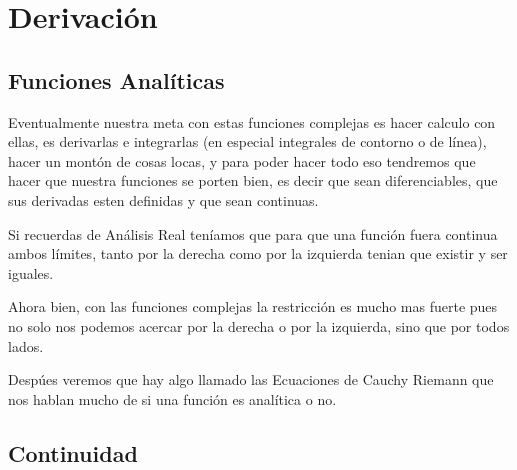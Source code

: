 \documentclass[12pt, fleqn]{report}                             %
\begin{document}
               


    \chapter{Derivación}
        \clearpage


   



        \section{Funciones Analíticas}

            Eventualmente nuestra meta con estas funciones complejas es hacer 
            calculo con ellas, es derivarlas e integrarlas (en especial integrales
            de contorno o de línea), hacer un montón de cosas locas, y para poder
            hacer todo eso tendremos que hacer que nuestra funciones se porten bien,
            es decir que sean diferenciables, que sus derivadas esten definidas y
            que sean continuas.

            Si recuerdas de Análisis Real teníamos que para que una función fuera 
            continua ambos límites, tanto por la derecha como por la izquierda 
            tenian que existir y ser iguales.

            Ahora bien, con las funciones complejas la restricción es mucho mas fuerte
            pues no solo nos podemos acercar por la derecha o por la izquierda, sino que 
            por todos lados.

            Despúes veremos que hay algo llamado las Ecuaciones de Cauchy Riemann que
            nos hablan mucho de si una función es analítica o no.


        \section{Continuidad}
\end{document}
